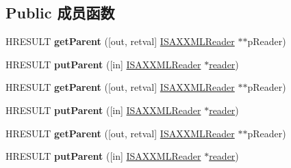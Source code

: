 \subsection*{Public 成员函数}
\begin{DoxyCompactItemize}
\item 
\mbox{\label{interface_m_s_x_m_l2_1_1_i_s_a_x_x_m_l_filter_a658213847b7da5cc80b3f0a21a356e1a}} 
H\+R\+E\+S\+U\+LT {\bfseries get\+Parent} (\mbox{[}out, retval\mbox{]} \hyperlink{interface_m_s_x_m_l2_1_1_i_s_a_x_x_m_l_reader}{I\+S\+A\+X\+X\+M\+L\+Reader} $\ast$$\ast$p\+Reader)
\item 
\mbox{\label{interface_m_s_x_m_l2_1_1_i_s_a_x_x_m_l_filter_a431d082442e5124a6b24c2fb938c1805}} 
H\+R\+E\+S\+U\+LT {\bfseries put\+Parent} (\mbox{[}in\mbox{]} \hyperlink{interface_m_s_x_m_l2_1_1_i_s_a_x_x_m_l_reader}{I\+S\+A\+X\+X\+M\+L\+Reader} $\ast$\hyperlink{structreader}{reader})
\item 
\mbox{\label{interface_m_s_x_m_l2_1_1_i_s_a_x_x_m_l_filter_a658213847b7da5cc80b3f0a21a356e1a}} 
H\+R\+E\+S\+U\+LT {\bfseries get\+Parent} (\mbox{[}out, retval\mbox{]} \hyperlink{interface_m_s_x_m_l2_1_1_i_s_a_x_x_m_l_reader}{I\+S\+A\+X\+X\+M\+L\+Reader} $\ast$$\ast$p\+Reader)
\item 
\mbox{\label{interface_m_s_x_m_l2_1_1_i_s_a_x_x_m_l_filter_a431d082442e5124a6b24c2fb938c1805}} 
H\+R\+E\+S\+U\+LT {\bfseries put\+Parent} (\mbox{[}in\mbox{]} \hyperlink{interface_m_s_x_m_l2_1_1_i_s_a_x_x_m_l_reader}{I\+S\+A\+X\+X\+M\+L\+Reader} $\ast$\hyperlink{structreader}{reader})
\item 
\mbox{\label{interface_m_s_x_m_l2_1_1_i_s_a_x_x_m_l_filter_a658213847b7da5cc80b3f0a21a356e1a}} 
H\+R\+E\+S\+U\+LT {\bfseries get\+Parent} (\mbox{[}out, retval\mbox{]} \hyperlink{interface_m_s_x_m_l2_1_1_i_s_a_x_x_m_l_reader}{I\+S\+A\+X\+X\+M\+L\+Reader} $\ast$$\ast$p\+Reader)
\item 
\mbox{\label{interface_m_s_x_m_l2_1_1_i_s_a_x_x_m_l_filter_a431d082442e5124a6b24c2fb938c1805}} 
H\+R\+E\+S\+U\+LT {\bfseries put\+Parent} (\mbox{[}in\mbox{]} \hyperlink{interface_m_s_x_m_l2_1_1_i_s_a_x_x_m_l_reader}{I\+S\+A\+X\+X\+M\+L\+Reader} $\ast$\hyperlink{structreader}{reader})
\end{DoxyCompactItemize}
